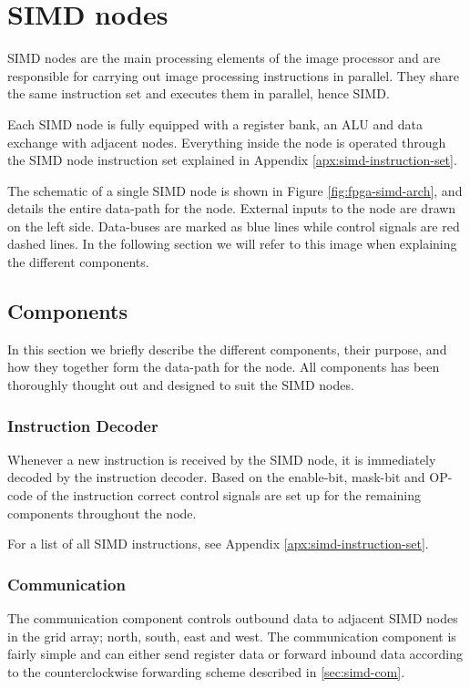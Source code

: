 \section{SIMD nodes}

\ac{SIMD} nodes are the main processing elements of the image processor and are
responsible for carrying out image processing instructions in parallel. They
share the same instruction set and executes them in parallel, hence
\acf{SIMD}.

Each \ac{SIMD} node is fully equipped with a register bank,
an \ac{ALU} and data exchange with adjacent nodes.
Everything inside the node is operated through the SIMD node
instruction set explained in Appendix \ref{apx:simd-instruction-set}.

The schematic of a single \ac{SIMD} node is shown in Figure
\ref{fig:fpga-simd-arch}, and details the entire data-path for the
node. External inputs to the node are drawn on the left side. Data-buses are 
marked as blue lines while control signals are red dashed lines. In the 
following section we will refer to this image when explaining the different 
components.



\subsection{Components}
In this section we briefly describe the different components, their purpose, and
how they together form the data-path for the node. All components has been thoroughly
thought out and designed to suit the \ac{SIMD} nodes.  

\subsubsection{Instruction Decoder}
Whenever a new instruction is received by the \ac{SIMD} node, it is immediately 
decoded by the instruction decoder. Based on the enable-bit, mask-bit and OP-code
of the instruction correct control signals are set up for the remaining components
throughout the node.

For a list of all \ac{SIMD} instructions, see Appendix \ref{apx:simd-instruction-set}.

\subsubsection{Communication}
The communication component controls outbound data to adjacent \ac{SIMD} nodes in 
the grid array; north, south, east and west. The communication component is fairly 
simple and can either send register data or forward inbound data according to the 
counterclockwise forwarding scheme described in \ref{sec:simd-com}.

